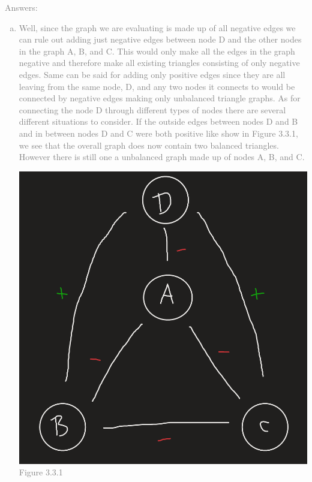 \documentclass[11pt]{article}
\begin{document}
\textcolor{gray}{
Answers:
\begin{enumerate}[(a)]
	\item Well, since the graph we are evaluating is made up of all negative edges we can rule out adding just negative edges between node D and the other nodes in the graph A, B, and C.  This would only make all the edges in the graph negative and  therefore make all existing triangles consisting of only negative edges.  Same can be said for adding only positive edges since they are all leaving from the same node, D, and any two nodes it connects to would be connected by negative edges making only unbalanced triangle graphs. As for connecting the node D through different types of nodes there are several different situations to consider.  If the outside edges between nodes D and B and in between nodes D and C were both positive like show in Figure 3.3.1, we see that the overall graph does now contain two balanced triangles.  However there is still one a unbalanced graph made up of nodes A, B, and C.\\
\begin{center}
	\includegraphics[scale=1]{Figure_3_3_1}\\
	Figure 3.3.1
\end{center}
\begin{center}

\end{center}
\end{enumerate}}
\end{document}

